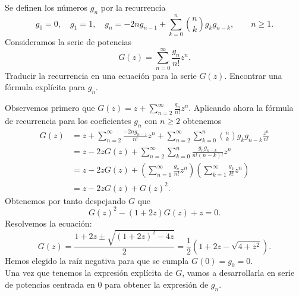 \documentclass[twoside]{article}
\newcommand{\sumno}{\sum_{n=0}^{\infty}}
\newcommand{\sumn}{\sum_{n=1}^{\infty}}
\begin{document}
\newpage 
\begin{ejercicio}{8}
Se definen los números $g_n$ por la recurrencia \begin{equation*}
g_0 = 0, \quad g_1 = 1, \quad g_n = -2ng_{n-1} + \sum_{k=0}^n \binom{n}{k}g_k g_{n-k}, \qquad n \geq 1.
\end{equation*}
Consideramos la serie de potencias \begin{equation*}
G(z) = \sumno \frac{g_n}{n!}z^n.
\end{equation*}
Traducir la recurrencia en una ecuación para la serie $G(z)$. Encontrar una fórmula explícita para $g_n$.
\end{ejercicio}
\begin{solucion}
Observemos primero que $G(z) = z + \sum_{n=2}^{\infty} \frac{g_n}{n!}z^n$. Aplicando ahora la fórmula de recurrencia para los coeficientes $g_n$ con $n \geq 2$ obtenemos \begin{equation*}
\begin{split}
G(z) & =  z+ \sum_{n=2}^\infty \frac{-2ng_{n-1}}{n!} z^n + \sum_{n=2}^\infty \sum_{k=0}^n \binom{n}{k}g_kg_{n-k} \frac{z^n}{n!} \\ & = z -2zG(z) + \sum_{n=2}^\infty \sum_{k=0}^n \frac{g_n g_{n-k}}{n!(n-k)!}z^n \\ & = z - 2zG(z) + \left(\sumn \frac{g_n}{n!}z^n \right) \left( \sum_{k=1}^\infty \frac{g_k}{k!}z^n \right) \\ & = z - 2zG(z) + G(z)^2.
\end{split}
\end{equation*}
Obtenemos por tanto despejando $G$ que \begin{equation*}
G(z)^2 - (1+2z)G(z) + z = 0.
\end{equation*}
Resolvemos la ecuación: \begin{equation*}
G(z) = \frac{1+2z \pm \sqrt{(1+2z)^2 - 4z}}{2} = \frac{1}{2} \left( 1 + 2z - \sqrt{4 + z^2} \right).
\end{equation*}
Hemos elegido la raíz negativa para que se cumpla $G(0) = g_0 = 0$. \\
Una vez que tenemos la expresión explícita de $G$, vamos a desarrollarla en serie de potencias centrada en 0 para obtener la expresión de $g_n$. \\


\end{solucion}
\end{document}
